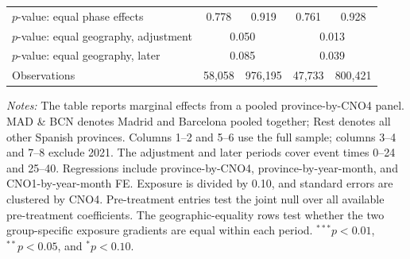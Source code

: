 \begin{table}[!t]
\begin{threeparttable}
\begin{tabular}{@{}lcccc@{}}
$p$-value: equal phase effects & 0.778 & 0.919 & 0.761 & 0.928 \\
$p$-value: equal geography, adjustment & \multicolumn{2}{c}{0.050} & \multicolumn{2}{c}{0.013} \\
$p$-value: equal geography, later & \multicolumn{2}{c}{0.085} & \multicolumn{2}{c}{0.039} \\
Observations & 58,058 & 976,195 & 47,733 & 800,421 \\
\bottomrule
\end{tabular}
\begin{tablenotes}[flushleft]
\footnotesize
\item \emph{Notes:} The table reports marginal effects from a pooled province-by-CNO4 panel. MAD \& BCN denotes Madrid and Barcelona pooled together; Rest denotes all other Spanish provinces. Columns 1--2 and 5--6 use the full sample; columns 3--4 and 7--8 exclude 2021. The adjustment and later periods cover event times 0--24 and 25--40. Regressions include province-by-CNO4, province-by-year-month, and CNO1-by-year-month FE. Exposure is divided by 0.10, and standard errors are clustered by CNO4. Pre-treatment entries test the joint null over all available pre-treatment coefficients. The geographic-equality rows test whether the two group-specific exposure gradients are equal within each period. $^{***}p<0.01$, $^{**}p<0.05$, and $^{*}p<0.10$.
\end{tablenotes}
\end{threeparttable}
\end{table}
